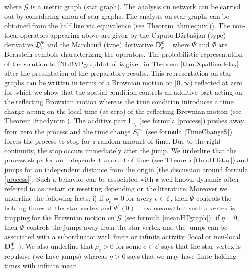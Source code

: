 \documentclass[11pt,a4paper]{article}
\theoremstyle{plain}
\theoremstyle{definition}
\theoremstyle{remark}
\begin{document}
	where $\mathcal{G}$ is a metric graph (star graph). The analysis on network can be carried out by considering union of star graphs.  The analysis on star graphs can be obtained from the half line via equivalence (see Theorem \ref{thm:equiv})). The non-local operators appearing above are given by the Caputo-D\v{z}rba\v{s}jan (type) derivative $\mathfrak{D}^\Psi_t$ and the Marchaud (type) derivative $\mathbf{D}^\Phi_{x-}$ where $\Psi$ and $\Phi$ are Bernstein symbols characterizing the operators. The probabilistic representation of the solution to \eqref{NLBVPgraphIntro} is given in Theorem \ref{thm:Xpallinodelay} after the presentation of the preparatory results. This representation on star graphs can be written in terms of a Brownian motion on $[0, \infty)$ reflected at zero for which we show that the spatial condition controls an additive part acting on the reflecting Brownian motion whereas the time condition introduces a time change acting on the local time (at zero) of the reflecting Brownian motion (see Theorem \ref{fracdyntm}). The additive part $\mathsf{L_{\gamma_t}}$ (see formula \eqref{process}) pushes away from zero the process and the time change $S_t^{-1}$ (see formula \eqref{TimeChangeS}) forces the process to stop for a random amount of time. Due to the right-continuity, the stop occurs immediately after the jump. We underline that the process stops for an independent amount of time (see Theorem \ref{thm:HTstar}) and jumps for an independent distance from the origin (the discussion around formula \eqref{process}). Such a behavior can be associated with a well-known dynamic often referred to as restart or resetting depending on the literature. Moreover we underline the following facts: i) if $\rho_e = 0$ for avery $e \in \mathcal{E}$, then $\Psi$ controls the holding times at the star vertex and $\Psi^\prime (0)=\infty$ means that such a vertex is trapping for the Brownian motion on $\mathcal{G}$ (see formula \eqref{meanHTgraph}); if $\eta=0$, then $\Phi$ controls the jumps away from the star vertex and the jumps can be associated with a subordinator with finite or infinite activity (local or non-local ${\bf D}^\Phi_{x-}$). We also underline that $\rho_e>0$ for some $e \in \mathcal{E}$ says that the star vertex is repulsive (we have jumps) whereas $\eta>0$ says that we may have finite holding times with infinite mean.  \\
	
\end{document}
